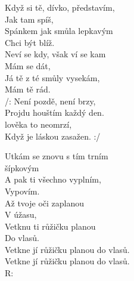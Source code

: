 

\ve{} 
Když si tě, dívko, představím,\\
Jak tam spíš,\\
Spánkem jak smůla lepkavým\\
Chci být blíž.\\
Neví se kdy, však ví se kam\\
Mám se dát,\\
Já tě z té smůly vysekám,\\
Mám tě rád.\\

\cho{}
/: Není pozdě, není brzy,\\
Projdu houštím každý den.\\
lověka to neomrzí,\\
Když je láskou zasažen\ch. :/

\ve{}
Utkám se znovu s tím trním\\
šípkovým\\
A pak ti všechno vyplním,\\
Vypovím.\\
Až tvoje oči zaplanou\\
V úžasu,\\
Vetknu ti růžičku planou\\
Do vlasů.\\


Vetkne jí růžičku planou do vlasů.\\
Vetkne jí růžičku planou do vlasů.\\


\re{}R:





\esong